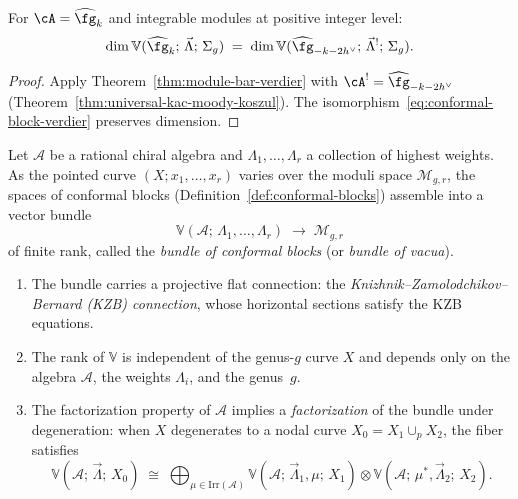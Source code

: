 \begin{corollary}
\label{cor:conformal-block-dim-invariance}
For $\cA = \widehat{\fg}_k$ and integrable modules at positive
integer level:
\[
\dim\mathbb{V}(\widehat{\fg}_k;\, \vec{\Lambda};\, \Sigma_g)
\;=\;
\dim\mathbb{V}(\widehat{\fg}_{-k-2h^\vee};\,
\vec{\Lambda}^!;\, \Sigma_g).
\]
\end{corollary}

\begin{proof}
Apply Theorem~\ref{thm:module-bar-verdier} with
$\cA^! = \widehat{\fg}_{-k-2h^\vee}$
(Theorem~\ref{thm:universal-kac-moody-koszul}).
The isomorphism~\eqref{eq:conformal-block-verdier} preserves
dimension.
\end{proof}

\begin{definition}
\label{def:bundle-conformal-blocks}
Let $\mathcal{A}$ be a rational chiral algebra and
$\Lambda_1, \ldots, \Lambda_r$ a collection of highest weights.
As the pointed curve $(X; x_1, \ldots, x_r)$ varies over the moduli
space $\mathcal{M}_{g,r}$, the spaces of conformal blocks
(Definition~\ref{def:conformal-blocks}) assemble into a vector bundle
\begin{equation}\label{eq:conformal-block-bundle}
\mathbb{V}(\mathcal{A};\, \Lambda_1, \ldots, \Lambda_r)
\;\to\; \mathcal{M}_{g,r}
\end{equation}
of finite rank, called the \emph{bundle of conformal blocks} (or
\emph{bundle of vacua}).
\begin{enumerate}[label=\textup{(\roman*)}]
\item The bundle carries a projective flat connection: the
  \emph{Knizhnik--Zamolodchikov--Bernard (KZB) connection},
  whose horizontal sections satisfy the KZB equations.
\item The rank of $\mathbb{V}$ is independent of the genus-$g$
  curve $X$ and depends only on the algebra $\mathcal{A}$, the
  weights $\Lambda_i$, and the genus~$g$.
\item The factorization property of $\mathcal{A}$ implies a
  \emph{factorization} of the bundle under degeneration: when $X$
  degenerates to a nodal curve $X_0 = X_1 \cup_p X_2$, the fiber
  satisfies
  \[
  \mathbb{V}(\mathcal{A};\, \vec{\Lambda};\, X_0)
  \;\cong\;
  \bigoplus_{\mu \in \mathrm{Irr}(\mathcal{A})}
  \mathbb{V}(\mathcal{A};\, \vec{\Lambda}_1, \mu;\, X_1)
  \otimes
  \mathbb{V}(\mathcal{A};\, \mu^*, \vec{\Lambda}_2;\, X_2).
  \]
\end{enumerate}
\end{definition}

